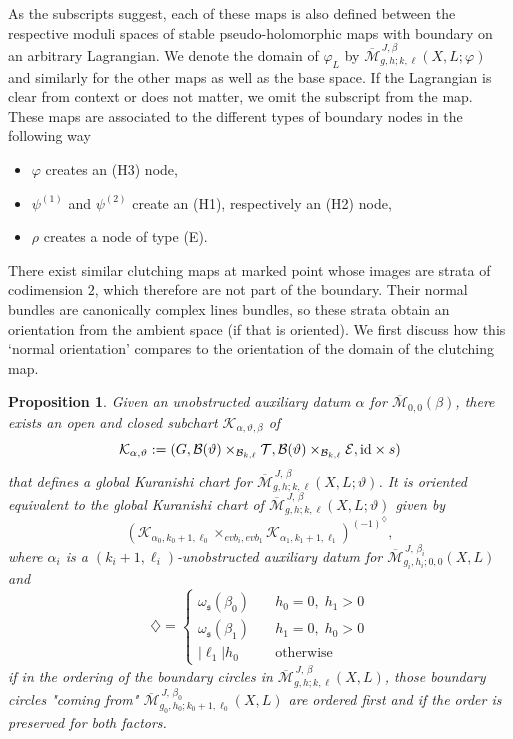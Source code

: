 \documentclass[11pt,psamsfonts, oneside, reqno]{amsart}
\newcommand{\ide}{\normalfont\text{id}}
\newcommand{\Mbar}{\overline{\mathcal M}}
\newcommand{\cB}{\mathcal{B}}
\newcommand{\cE}{\mathcal{E}}
\newcommand{\cK}{\mathcal{K}}
\newcommand{\cT}{\mathcal{T}}
\newcommand{\fs}{\mathfrak{s}}
\newcommand{\evab}{evb}
\newcommand{\obs}{s}
\newcommand{\M}[1]{\Mbar_{#1}}
\newtheorem{proposition}[theorem]{Proposition}
\theoremstyle{definition}
\theoremstyle{remark}
\numberwithin{equation}{section}
\begin{document}
As the subscripts suggest, each of these maps is also defined between the respective moduli spaces of stable pseudo-holomorphic maps with boundary on an arbitrary Lagrangian. We denote the domain of $\varphi_L$ by $\Mbar_{g,h;k,\ell}^{\,J,\beta}(X,L;\varphi)$ and similarly for the other maps as well as the base space. If the Lagrangian is clear from context or does not matter, we omit the subscript from the map. These maps are associated to the different types of boundary nodes in the following way
\begin{itemize}
	\item $\varphi$ creates an (H3) node, 
	\item $\psi^{(1)}$ and $\psi^{(2)}$ create an (H1), respectively an (H2) node,
	\item $\rho$ creates a node of type (E).
\end{itemize}

There exist similar clutching maps at marked point whose images are strata of codimension $2$, which therefore are not part of the boundary. Their normal bundles are canonically complex lines bundles, so these strata obtain an orientation from the ambient space (if that is oriented). We first discuss how this `normal orientation' compares to the orientation of the domain of the clutching map.

\begin{proposition}\label{prop:interior-clutching-orientation} Given an unobstructed auxiliary datum $\alpha$ for $\M{0,0}(\beta)$, there exists an open and closed subchart $\cK_{\alpha,\vartheta,\beta}$ of 
	$$\cK_{\alpha,\vartheta}:= (G,\cB(\vartheta)\times_{\cB_{k,\ell}}\cT,\cB(\vartheta)\times_{\cB_{k,\ell}}\cE,\ide\times\obs)$$\noindent
	that defines a global Kuranishi chart for $\Mbar^{\,J,\,\beta}_{g,h;k,\ell}(X,L;\vartheta)$. It is oriented equivalent to the global Kuranishi chart of $\Mbar^{\,J,\,\beta}_{g,h;k,\ell}(X,L;\vartheta)$ given by
	$$(\cK_{\alpha_0,k_0+1,\ell_0}\times_{\evab_i,\evab_1}\cK_{\alpha_1,k_1+1,\ell_1})^{(-1)^{\diamondsuit}},$$\noindent
	where $\alpha_i$ is a $(k_i+1,\ell_i)$-unobstructed auxiliary datum for $\Mbar_{g_i,h_i;0,0}^{\,J,\,\beta_i}(X,L)$ and
	\begin{equation}\label{sign-interior}\diamondsuit =  \begin{cases}
			\omega_\fs(\beta_0) \quad & h_0 = 0,\;h_1 > 0\\
			\omega_\fs(\beta_1)\quad & h_1 = 0,\;h_0 > 0\\
			|\ell_1|h_0\quad & \text{otherwise}
	\end{cases} \end{equation}
	if in the ordering of the boundary circles in $\Mbar^{\,J,\,\beta}_{g,h;k,\ell}(X,L)$, those boundary circles "coming from" $\Mbar_{g_0,h_0;k_0+1,\ell_0}^{\,J,\,\beta_0}(X,L)$ are ordered first and if the order is preserved for both factors.
\end{proposition}
\end{document}
